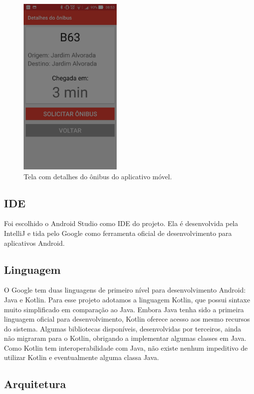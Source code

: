 \documentclass[
	12pt,				%
	oneside,			%
	a4paper,			%
	brazil				%
]{abntex2}
\begin{document}
\begin{figure}[h]
\centering
\includegraphics[width=5cm, center]{images/beacon_detail_bus}
\caption{Tela com detalhes do ônibus do aplicativo móvel.}
\label{Rotulo}
\end{figure}

\newpage

\subsection{IDE}

Foi escolhido o Android Studio como IDE do projeto. Ela é desenvolvida pela IntelliJ e tida pelo Google como ferramenta oficial de desenvolvimento para aplicativos Android.

\subsection{Linguagem}

O Google tem duas linguagens de primeiro nível para desenvolvimento Android: Java e Kotlin. Para esse projeto adotamos a linguagem Kotlin, que possui sintaxe muito simplificado em comparação ao Java. Embora Java tenha sido a primeira linguagem oficial para desenvolvimento, Kotlin oferece acesso aos mesmo recursos do sistema.
Algumas bibliotecas disponíveis, desenvolvidas por terceiros, ainda não migraram para o Kotlin, obrigando a implementar algumas classes em Java. Como Kotlin tem interoperabilidade com Java, não existe nenhum impeditivo de utilizar Kotlin e eventualmente alguma classa Java.

\newpage

\subsection{Arquitetura}
\end{document}
